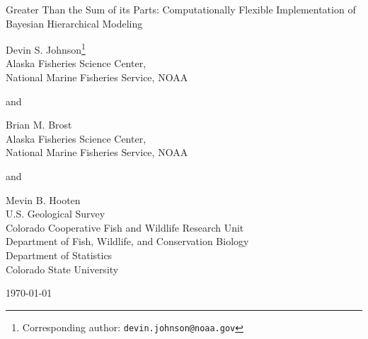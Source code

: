 \documentclass[12pt]{article}
\begin{document}

\vspace*{\fill}

\begin{center}
\setlength{\parindent}{0pt}
\renewcommand{\baselinestretch}{1.8}\normalsize

{\Large Greater Than the Sum of its Parts: Computationally Flexible Implementation of Bayesian Hierarchical Modeling}

\renewcommand{\baselinestretch}{1.15}\normalsize 
\bigskip\bigskip

Devin S. Johnson\footnote{Corresponding author: {\tt devin.johnson@noaa.gov}}\\ 
Alaska Fisheries Science Center,\\
National Marine Fisheries Service, NOAA \medskip

and\medskip

Brian M. Brost\\
Alaska Fisheries Science Center,\\
National Marine Fisheries Service, NOAA \medskip

and\medskip

Mevin B. Hooten \\
U.S. Geological Survey\\
Colorado Cooperative Fish and Wildlife Research Unit\\
Department of Fish, Wildlife, and Conservation Biology\\
Department of Statistics\\
Colorado State University

\bigskip\bigskip

\today

\end{center}

\vspace*{\fill}

\clearpage


\end{document}
